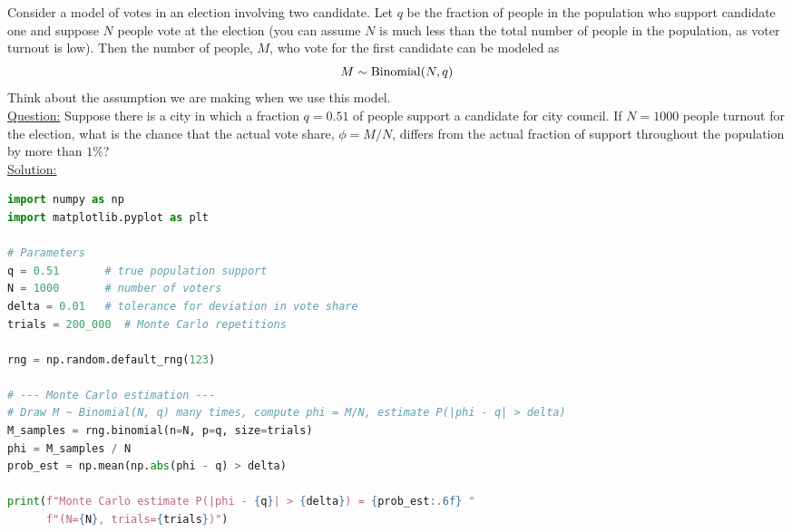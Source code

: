  
 \begin{example}
 Consider a model of votes in an election involving two candidate. Let $q$ be the fraction of people in the population who support candidate one and suppose $N$ people vote at the election (you can assume $N$ is much less than the total number of people in the population, as voter turnout is low). Then the number of people, $M$, who vote for the first candidate can be modeled as 
\begin{equation*}
M \sim {\rm Binomial}(N,q)
\end{equation*}
Think about the assumption we are making when we use this model. \\

 \noindent
\underline{Question:} Suppose there is a city in which a fraction $q = 0.51$ of people support a candidate for city council. If $N=1000$ people turnout for the election, what is the chance that the actual vote share, $\phi = M/N$, differs from the actual fraction of support throughout the population by more than $1\%$?\\

 \noindent
\underline{Solution:} 

\begin{lstlisting}[language=Python]
import numpy as np
import matplotlib.pyplot as plt

# Parameters
q = 0.51       # true population support
N = 1000       # number of voters
delta = 0.01   # tolerance for deviation in vote share
trials = 200_000  # Monte Carlo repetitions

rng = np.random.default_rng(123)

# --- Monte Carlo estimation ---
# Draw M ~ Binomial(N, q) many times, compute phi = M/N, estimate P(|phi - q| > delta)
M_samples = rng.binomial(n=N, p=q, size=trials)
phi = M_samples / N
prob_est = np.mean(np.abs(phi - q) > delta)

print(f"Monte Carlo estimate P(|phi - {q}| > {delta}) = {prob_est:.6f} "
      f"(N={N}, trials={trials})")
\end{lstlisting}
\end{example}

